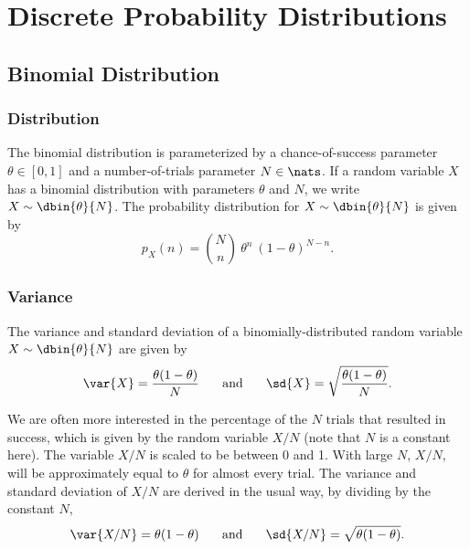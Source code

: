 \section{Discrete Probability Distributions}


\subsection{Binomial Distribution}

\subsubsection{Distribution}

The binomial distribution is parameterized by a chance-of-success
parameter $\theta \in [0,1]$ and a number-of-trials parameter $N \in
\nats$.  If a random variable $X$ has a binomial distribution with
parameters $\theta$ and $N$, we write $X \sim \dbin{\theta}{N}$.  The
probability distribution for $X \sim \dbin{\theta}{N}$ is given by 
%
\begin{equation}
p_X(n) = {N \choose n} \ \theta^{n} \ (1-\theta)^{N-n}.
\end{equation}
%
%

\subsubsection{Variance}\label{section:stats-binomial-variance}

The variance and standard deviation of a binomially-distributed random
variable $X \sim \dbin{\theta}{N}$ are given by
%
\begin{equation}
\hfill
\var{X} = \frac{\theta (1 - \theta)}{N} 
\hspace*{0.25in}
\mbox{and}
\hspace*{0.25in}
\sd{X} = \sqrt{\frac{\theta (1 - \theta)}{N}}.
\hfill
\end{equation}
%

We are often more interested in the percentage of the $N$ trials that
resulted in success, which is given by the random variable $X/N$ (note
that $N$ is a constant here).  The variable $X/N$ is scaled to be
between 0 and 1.  With large $N$, $X/N$, will be approximately equal
to $\theta$ for almost every trial.  The variance and standard
deviation of $X/N$ are derived in the usual way, by dividing by the
constant $N$,
%
\begin{equation}
\var{X/N} = \theta (1 - \theta) 
\hspace*{0.25in}
\mbox{and}
\hspace*{0.25in}
\sd{X/N} = \sqrt{\theta (1-\theta)}.
\end{equation}



